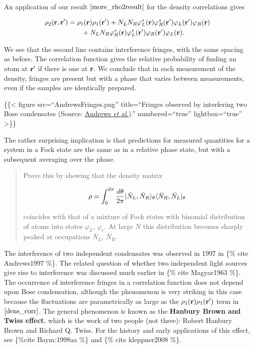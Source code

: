 An application of our result \(\eqref{more_rho2result}\) for the density
correlations gives

\[
\begin{align}
    \rho_2(\mathbf{r},\mathbf{r}')&=\rho_1(\mathbf{r})\rho_1(\mathbf{r}')
    +N_LN_{R}\varphi_L^*(\mathbf{r})\varphi_R^*(\mathbf{r}')\varphi_L(\mathbf{r}')\varphi_R(\mathbf{r}) \nonumber\\
    &\qquad+N_{L}N_R\varphi_R^*(\mathbf{r})\varphi_L^*(\mathbf{r}')
    \varphi_R(\mathbf{r}')\varphi_L(\mathbf{r}).
  \label{dens_corr}
\end{align}
\]

We see that the second line contains interference fringes, with the same
spacing as before. The correlation function gives the relative
probability of finding an atom at \(\mathbf{r}'\) if there is one at \(\mathbf{r}\).
We conclude that in each measurement of the density, fringes are present
but with a phase that varies between measurements, even if the samples
are identically prepared.

\{\{\textless{} figure src=``AndrewsFringes.png'' title=``Fringes
observed by interfering two Bose condensates (Source:
\href{https://science.sciencemag.org/content/275/5300/637}{Andrews
\emph{et al.}}).'' numbered=``true'' lightbox=``true'' \textgreater\}\}

The rather surprising implication is that predictions for measured
quantities for a system in a Fock state are the same as in a relative
phase state, but with a subsequent averaging over the phase.

\begin{quote}
Prove this by showing that the density matrix

\[
\rho=\int_0^{2\pi}\frac{d\theta}{2\pi}\lvert{\bar N_L,\bar N_R}\rangle_\theta\langle{\bar N_R,\bar N_L}\rvert_\theta
\]

coincides with that of a mixture of Fock states with binomial
distribution of atoms into states \(\varphi_{L}\), \(\varphi_{r}\). At
large \(N\) this distribution becomes sharply peaked at occupations
\(\bar N_L\), \(\bar N_R\).
\end{quote}

The interference of two independent condensates was observed in 1997 in
\{\% cite Andrews1997 \%\}. The related question of whether two
independent light sources give rise to interference was discussed much
earlier in \{\% cite Magyar1963 \%\}. The occurrence of interference
fringes in a correlation function does not depend upon Bose
condensation, although the phenomenon is very striking in this case
because the fluctuations are parametrically as large as the
\(\rho_1(\mathbf{r})\rho_1(\mathbf{r}')\) term in \(\eqref{dens_corr}\). The general
phenomenon is known as the \textbf{Hanbury Brown and Twiss effect},
which is the work of two people (not three): Robert Hanbury Brown and
Richard Q. Twiss. For the history and early applications of this effect,
see \{\%cite Baym:1998aa \%\} and \{\% cite kleppner2008 \%\}.

